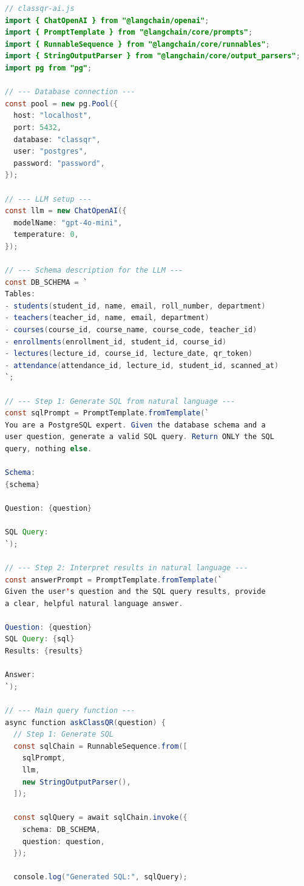 \documentclass[11pt,a4paper]{article}
\begin{document}
\begin{lstlisting}[language=Java, caption={ClassQR --- LangChain SQL Agent (Node.js)},
  morekeywords={const,let,async,await,import,from,export}]
// classqr-ai.js
import { ChatOpenAI } from "@langchain/openai";
import { PromptTemplate } from "@langchain/core/prompts";
import { RunnableSequence } from "@langchain/core/runnables";
import { StringOutputParser } from "@langchain/core/output_parsers";
import pg from "pg";

// --- Database connection ---
const pool = new pg.Pool({
  host: "localhost",
  port: 5432,
  database: "classqr",
  user: "postgres",
  password: "password",
});

// --- LLM setup ---
const llm = new ChatOpenAI({
  modelName: "gpt-4o-mini",
  temperature: 0,
});

// --- Schema description for the LLM ---
const DB_SCHEMA = `
Tables:
- students(student_id, name, email, roll_number, department)
- teachers(teacher_id, name, email, department)
- courses(course_id, course_name, course_code, teacher_id)
- enrollments(enrollment_id, student_id, course_id)
- lectures(lecture_id, course_id, lecture_date, qr_token)
- attendance(attendance_id, lecture_id, student_id, scanned_at)
`;

// --- Step 1: Generate SQL from natural language ---
const sqlPrompt = PromptTemplate.fromTemplate(`
You are a PostgreSQL expert. Given the database schema and a
user question, generate a valid SQL query. Return ONLY the SQL
query, nothing else.

Schema:
{schema}

Question: {question}

SQL Query:
`);

// --- Step 2: Interpret results in natural language ---
const answerPrompt = PromptTemplate.fromTemplate(`
Given the user's question and the SQL query results, provide
a clear, helpful natural language answer.

Question: {question}
SQL Query: {sql}
Results: {results}

Answer:
`);

// --- Main query function ---
async function askClassQR(question) {
  // Step 1: Generate SQL
  const sqlChain = RunnableSequence.from([
    sqlPrompt,
    llm,
    new StringOutputParser(),
  ]);

  const sqlQuery = await sqlChain.invoke({
    schema: DB_SCHEMA,
    question: question,
  });

  console.log("Generated SQL:", sqlQuery);


\end{lstlisting}
\end{document}
